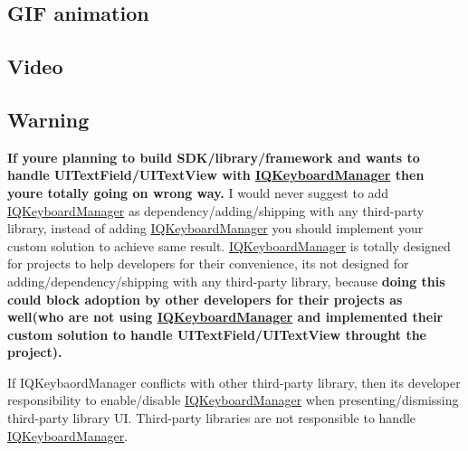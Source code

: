 \href{http://youtu.be/6nhLw6hju2A}{\tt } \href{http://youtu.be/6nhLw6hju2A}{\tt }

\subsection*{G\+IF animation}

\href{http://youtu.be/6nhLw6hju2A}{\tt }

\subsection*{Video}

\href{http://youtu.be/WAYc2Qj-OQg}{\tt }

\subsection*{Warning}


\begin{DoxyItemize}
\item {\bfseries If you\textquotesingle{}re planning to build S\+D\+K/library/framework and wants to handle U\+I\+Text\+Field/\+U\+I\+Text\+View with \mbox{\hyperlink{interface_i_q_keyboard_manager}{I\+Q\+Keyboard\+Manager}} then you\textquotesingle{}re totally going on wrong way.} I would never suggest to add \mbox{\hyperlink{interface_i_q_keyboard_manager}{I\+Q\+Keyboard\+Manager}} as dependency/adding/shipping with any third-\/party library, instead of adding \mbox{\hyperlink{interface_i_q_keyboard_manager}{I\+Q\+Keyboard\+Manager}} you should implement your custom solution to achieve same result. \mbox{\hyperlink{interface_i_q_keyboard_manager}{I\+Q\+Keyboard\+Manager}} is totally designed for projects to help developers for their convenience, it\textquotesingle{}s not designed for adding/dependency/shipping with any third-\/party library, because {\bfseries doing this could block adoption by other developers for their projects as well(who are not using \mbox{\hyperlink{interface_i_q_keyboard_manager}{I\+Q\+Keyboard\+Manager}} and implemented their custom solution to handle U\+I\+Text\+Field/\+U\+I\+Text\+View throught the project).}
\item If I\+Q\+Keybaord\+Manager conflicts with other third-\/party library, then it\textquotesingle{}s developer responsibility to enable/disable \mbox{\hyperlink{interface_i_q_keyboard_manager}{I\+Q\+Keyboard\+Manager}} when presenting/dismissing third-\/party library UI. Third-\/party libraries are not responsible to handle \mbox{\hyperlink{interface_i_q_keyboard_manager}{I\+Q\+Keyboard\+Manager}}.
\end{DoxyItemize}

